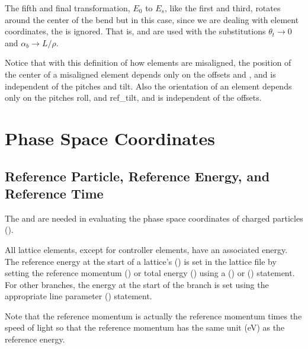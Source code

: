 The fifth and final transformation, $E_0$ to $E_s$, like the first and third, rotates around the
center of the bend but in this case, since we are dealing with element coordinates, the
 is ignored.  That is,  and  are used with the substitutions
$\theta_t \rightarrow 0$ and $\alpha_b \rightarrow L/\rho$.

Notice that with this definition of how elements are misaligned, the position of the center of a
misaligned element depends only on the offsets and , and is independent of the pitches and
tilt. Also the orientation of an element depends only on the pitches roll, and ref_tilt, and is
independent of the offsets.

\section{Phase Space Coordinates}
\label{s:phase.coords}

\subsection{Reference Particle, Reference Energy, and Reference Time}
\label{s:ref.energy}

The  and  are needed in evaluating the phase space
coordinates of charged particles ().

All lattice elements, except for controller elements, have an associated 
energy.  The reference energy at the start of a lattice's  () is
set in the lattice file by setting the reference momentum () or total energy ()
using a  () or  () statement. For other
branches, the energy at the start of the branch is set using the appropriate line parameter
() statement.

Note that the reference momentum  is actually the reference momentum times the speed of light
so that the reference momentum has the same unit (eV) as the reference energy.

